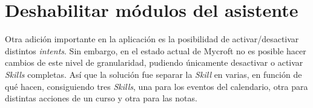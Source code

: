\section{Deshabilitar módulos del asistente}

Otra adición importante en la aplicación es la posibilidad de activar/desactivar distintos \textit{intents}. Sin embargo, en el estado actual de Mycroft no es posible hacer cambios de este nivel de granularidad, pudiendo únicamente desactivar o activar \textit{Skills} completas. Así que la solución fue separar la \textit{Skill} en varias, en función de qué hacen, consiguiendo tres \textit{Skills}, una para los eventos del calendario, otra para distintas acciones de un curso y otra para las notas.

